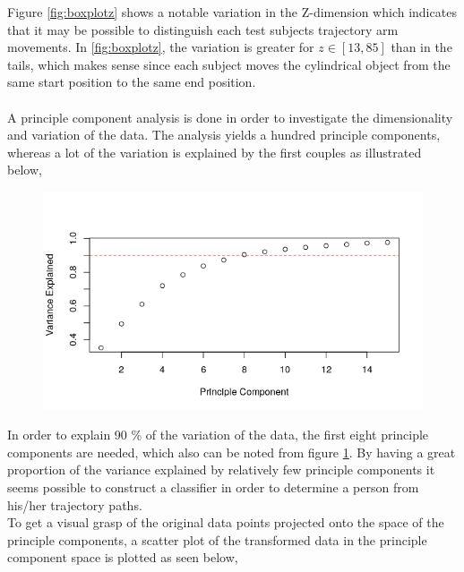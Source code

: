 \documentclass[11pt, fleqn, titlepage]{article}
\begin{document}
Figure \ref{fig:boxplotz} shows a notable variation in the Z-dimension which indicates that it may be possible to distinguish each test subjects trajectory arm movements. In \ref{fig:boxplotz}, the variation is greater for $ z \in [13,85] $ than in the tails, which makes sense since each subject moves the cylindrical object from the same start position to the same end position.
\\\\
A principle component analysis is done in order to investigate the dimensionality and variation of the data. The analysis yields a hundred principle components, whereas a lot of the variation is explained by the first couples as illustrated below, 
\begin{figure}[H]
	\centering
	\includegraphics[width=0.7\linewidth]{billeder/varexp.png}
	\caption{}
	\label{fig:varexp}
\end{figure}

In order to explain 90 \% of the variation of the data, the first eight principle components are needed, which also can be noted from figure \ref{fig:varexp}. By having a great proportion of the variance explained by relatively few principle components it seems possible to construct a classifier in order to determine a person from his/her trajectory paths.
\\
To get a visual grasp of the original data points projected onto the space of the principle components, a scatter plot of the transformed data in the principle component space is plotted as seen below,
\end{document}
